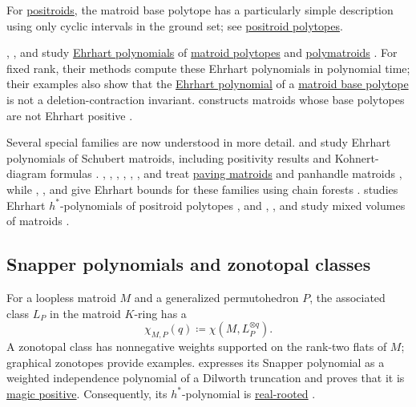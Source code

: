 For \hyperref[positroid]{positroids}, the matroid base polytope has a
particularly simple description using only cyclic intervals in the ground
set; see \hyperref[positroidPolytopes]{positroid polytopes}.

, , and
 study \hyperref[ehrhartPolynomialDefinition]{Ehrhart
polynomials} of \hyperref[matroidBasePolytope]{matroid polytopes} and
\hyperref[polymatroids]{polymatroids} \cite{DeLoera2008}.  For fixed rank,
their methods compute these
Ehrhart polynomials in polynomial time; their examples also show that the
\hyperref[ehrhartPolynomialDefinition]{Ehrhart polynomial} of a
\hyperref[matroidBasePolytope]{matroid base polytope} is not a
deletion-contraction invariant.
 constructs matroids whose base polytopes are not Ehrhart
positive \cite{Ferroni2022}.

Several special families are now understood in more detail.
 and  study Ehrhart polynomials of Schubert
matroids, including positivity results and Kohnert-diagram formulas
\cite{FanLi2023}.  , ,
, , ,
, and  treat
\hyperref[pavingMatroid]{paving matroids} and panhandle matroids
\cite{HanelyMartinMcGinnisMiyataNasrVindasMelendezYin2023},
while , , and
 give Ehrhart bounds for these families using
chain forests \cite{DeligeorgakiMcGinnisVindasMelendez2023x}.
 studies Ehrhart $h^*$-polynomials of positroid polytopes
\cite{Jiang2024x}, and , , and
 study mixed volumes of matroids \cite{HsiaoKaruYang2024x}.


\subsection[matroidSnapperPolynomials]{Snapper polynomials and zonotopal classes}

For a loopless matroid $M$ and a generalized permutohedron $P$, the associated
class $L_P$ in the matroid $K$-ring has a 
\[
 \chi_{M,P}(q)\coloneqq \chi(M,L_P^{\otimes q}).
\]
A zonotopal class has nonnegative weights supported on the rank-two flats of
$M$; graphical zonotopes provide examples.   expresses its
Snapper polynomial as a weighted independence polynomial of a Dilworth
truncation and proves that it is
\hyperref[magicPositivePolynomial]{magic positive}.  Consequently, its
$h^*$-polynomial is \hyperref[realRootedPolynomial]{real-rooted}
\cite[Thms.~1.1--1.2]{Li2026Snapper}.

